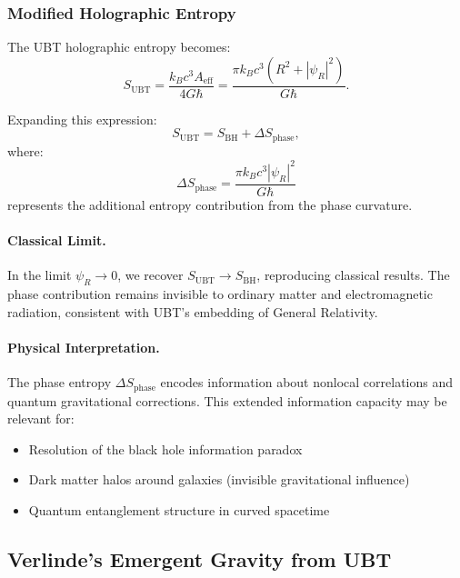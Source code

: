 \subsubsection{Modified Holographic Entropy}

The UBT holographic entropy becomes:
\begin{equation}
S_{\text{UBT}} = \frac{k_B c^3 A_{\text{eff}}}{4 G \hbar} = \frac{\pi k_B c^3 (R^2 + |\psi_R|^2)}{G \hbar}.
\label{eq:ubt_holographic_entropy}
\end{equation}

Expanding this expression:
\begin{equation}
S_{\text{UBT}} = S_{\text{BH}} + \Delta S_{\text{phase}},
\end{equation}
where:
\begin{equation}
\Delta S_{\text{phase}} = \frac{\pi k_B c^3 |\psi_R|^2}{G \hbar}
\end{equation}
represents the additional entropy contribution from the phase curvature.

\paragraph{Classical Limit.}
In the limit $\psi_R \to 0$, we recover $S_{\text{UBT}} \to S_{\text{BH}}$, reproducing classical results. The phase contribution remains invisible to ordinary matter and electromagnetic radiation, consistent with UBT's embedding of General Relativity.

\paragraph{Physical Interpretation.}
The phase entropy $\Delta S_{\text{phase}}$ encodes information about nonlocal correlations and quantum gravitational corrections. This extended information capacity may be relevant for:
\begin{itemize}
\item Resolution of the black hole information paradox
\item Dark matter halos around galaxies (invisible gravitational influence)
\item Quantum entanglement structure in curved spacetime
\end{itemize}

\subsection{Verlinde's Emergent Gravity from UBT}


